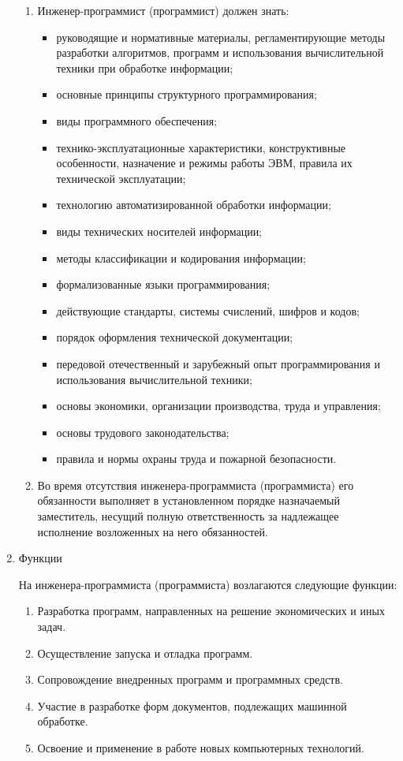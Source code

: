 \documentclass[12pt,a4paper,draft]{report}
\begin{document}
\begin{enumerate}
\begin{enumerate}
        \item Инженер-программист (программист) должен знать:
        \begin{itemize}
            \item руководящие и нормативные материалы, регламентирующие методы разработки алгоритмов, программ и использования вычислительной техники при обработке информации;
            \item основные принципы структурного программирования;
            \item виды программного обеспечения;
            \item технико-эксплуатационные характеристики, конструктивные особенности, назначение и режимы работы ЭВМ, правила их технической эксплуатации;
            \item технологию автоматизированной обработки информации;
            \item виды технических носителей информации;
            \item методы классификации и кодирования информации;
            \item формализованные языки программирования;
            \item действующие стандарты, системы счислений, шифров и кодов;
            \item порядок оформления технической документации;
            \item передовой отечественный и зарубежный опыт программирования и использования вычислительной техники;
            \item основы экономики, организации производства, труда и управления;
            \item основы трудового законодательства;
            \item правила и нормы охраны труда и пожарной безопасности.
        \end{itemize}

        \item Во время отсутствия инженера-программиста (программиста) его обязанности выполняет в установленном порядке назначаемый заместитель, несущий полную ответственность за надлежащее исполнение возложенных на него обязанностей.

    \end{enumerate}

    \item Функции

    На инженера-программиста (программиста) возлагаются следующие функции:
    \begin{enumerate}
        \item Разработка программ, направленных на решение экономических и иных задач.
        \item Осуществление запуска и отладка программ.
        \item Сопровождение внедренных программ и программных средств.
        \item Участие в разработке форм документов, подлежащих машинной обработке.
        \item Освоение и применение в работе новых компьютерных технологий.
    \end{enumerate}


\end{enumerate}
\end{document}
